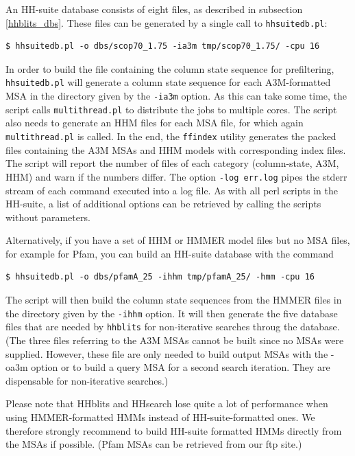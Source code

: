 \documentclass[11pt,a4paper]{article}
\begin{document}
An HH-suite database consists of eight files, as described in subsection \ref{hhblits_dbs}. These files can be generated by a single call to \verb`hhsuitedb.pl`:
\begin{verbatim}
$ hhsuitedb.pl -o dbs/scop70_1.75 -ia3m tmp/scop70_1.75/ -cpu 16
\end{verbatim}
In order to build the file containing the column state sequence for prefiltering, \verb`hhsuitedb.pl` will generate a column state sequence for each A3M-formatted MSA in the directory given by the \verb`-ia3m` option. As this can take some time, the script calls \verb`multithread.pl` to distribute the jobs to multiple cores. The script also needs to generate an HHM files for each MSA file, for which again \verb`multithread.pl` is called. In the end, the \verb`ffindex` utility generates the packed files containing the A3M MSAs and HHM models with corresponding index files. The script will report the number of files of each category (column-state, A3M, HHM) and warn if the numbers differ. The option \verb`-log err.log` pipes the stderr stream of each command executed into a log file. As with all perl scripts in the HH-suite, a list of additional options can be retrieved by calling the scripts without parameters.

Alternatively, if you have a set of HHM or HMMER model files but no MSA files, for example for Pfam, you can build an HH-suite database with the command
\begin{verbatim}
$ hhsuitedb.pl -o dbs/pfamA_25 -ihhm tmp/pfamA_25/ -hmm -cpu 16
\end{verbatim}
The script will then build the column state sequences from the HMMER files in the directory given by the \verb`-ihhm` option. It will then generate the five database files that are needed by \verb`hhblits` for non-iterative searches throug the database. (The three files referring to the A3M MSAs cannot be built since no MSAs were supplied. However, these file are only needed to build output MSAs with the -oa3m option or to build a query MSA for a second search iteration. They are dispensable for non-iterative searches.)

Please note that HHblits and HHsearch lose quite a lot of performance when using HMMER-formatted HMMs instead of HH-suite-formatted ones. We therefore strongly recommend to build HH-suite formatted HMMs directly from the MSAs if possible. (Pfam MSAs can be retrieved from our ftp site.)
\end{document}
